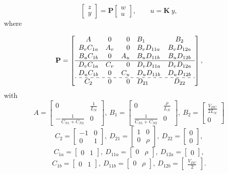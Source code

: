 \documentclass[landscape,a0,final]{a0poster}
\newcommand{\myfig}[3][0]{
\begin{center}
  \vspace{0.5cm}
  \scalebox{0.75}{\texttt{[image: \#2]}}
  \nobreak\medskip
\end{center}}
\newcommand{\arraylines}[1]{{\newcolumntype{r}{c|}#1}}
\newcommand{\arraydashlines}[1]{{\newcolumntype{l}{c:}#1}}
\begin{document}
\begin{multicols}{6}
\myfig{../../work/NeutralLeg/controlBlk_Hinf_c.eps}{1} 
\[
\left[ \begin{array}{c}
z\\
y
\end{array}\right] =\mathbf{P}\left[ \begin{array}{c}
w\\
u
\end{array}\right] ,\qquad u=\mathbf{K}\: y,\]
where
\arraylines{\small\arraydashlines{
\[
\mathbf{P}=\left[ \begin{array}{ccrlc}
A & 0 & 0 & B_{1} & B_{2}\\
B_{v}C_{1a} & A_{v} & 0 & B_{v}D_{11a} & B_{v}D_{12a}\\
B_{u}C_{1b} & 0 & A_{u} & B_{u}D_{11b} & B_{u}D_{12b}\\
\hline D_{v}C_{1a} & C_{v} & 0 & D_{v}D_{11a} & D_{v}D_{12a}\\
D_{u}C_{1b} & 0 & C_{u} & D_{u}D_{11b} & D_{u}D_{12b}\\
\hdashline C_{2} & 0 & 0 & D_{21} & D_{22}
\end{array}\right] ,\]
}with\[
A=\left[ \begin{array}{cc}
0 & \frac{1}{L_{N}}\\
-\frac{1}{C_{N1}+C_{N2}} & 0
\end{array}\right] ,\: B_{1}=\left[ \begin{array}{cc}
0 & \frac{\rho }{L_{N}}\\
\frac{1}{C_{N1}+C_{N2}} & 0
\end{array}\right] ,\: B_{2}=\left[ \begin{array}{c}
\frac{V_{DC}}{2L_{N}}\\
0
\end{array}\right]\]
 \[
C_{2}=\left[ \begin{array}{cc}
-1 & 0\\
0 & 1
\end{array}\right] ,\: D_{21}=\left[ \begin{array}{cc}
1 & 0\\
0 & \rho 
\end{array}\right] ,\: D_{22}=\left[ \begin{array}{c}
0\\
0
\end{array}\right] ,\]
\[
C_{1a}=\left[ \begin{array}{cc}
0 & 1
\end{array}\right] ,\: D_{11a}=\left[ \begin{array}{cc}
0 & \rho 
\end{array}\right] ,\: D_{12a}=\left[ \begin{array}{c}
0
\end{array}\right] ,\]
\[
C_{1b}=\left[ \begin{array}{cc}
0 & 1
\end{array}\right] ,\: D_{11b}=\left[ \begin{array}{cc}
0 & \rho 
\end{array}\right] ,\: D_{12b}=\left[ \begin{array}{c}
\frac{V_{DC}}{2}
\end{array}\right] .\]


}
\end{multicols}
\end{document}
